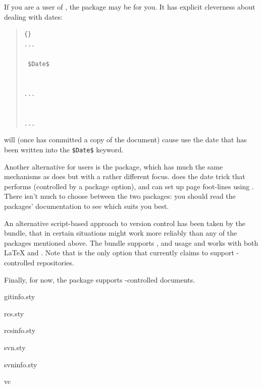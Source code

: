 If you are a user of , the package 
may be for you.  It has explicit cleverness about dealing with dates:
\begin{quote}
\texttt{\{\}}\\
\texttt{...}\\
\\
\texttt{ \$Date\$}\\
\\
\\
\texttt{...}\\
\\
\\
\texttt{...}\\
\end{quote}
will (once  has committed a copy of the document)
cause  use the date that has been written into the
\texttt{\$Date\$} keyword.

Another alternative for  users is the
 package, which has much the same mechanisms as does
 but with a rather different focus.  
does the date trick that  performs (controlled by a
package option), and can set up page foot-lines using %
.  There isn't much to
choose between the two packages: you should read the packages'
documentation to see which suits you best.

An alternative script-based approach to version control has been taken
by the  bundle, that in certain situations might work more
reliably than any of the packages mentioned above.  The 
bundle supports ,  and
 usage and works with both \LaTeX{} and
\plaintex{}.  Note that  is the only option that
currently claims to support -controlled repositories.

Finally, for now, the  package supports
-controlled documents.
\begin{ctanrefs}
\item[gitinfo.sty]
\item[rcs.sty]
\item[rcsinfo.sty]
\item[svn.sty]
\item[svninfo.sty]
\item[vc]
\end{ctanrefs}

